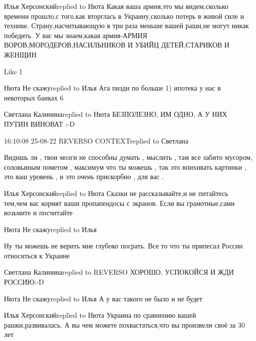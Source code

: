  
 
 
 
 

Илья Херсонскийreplied to Нюта
Какая ваша армия,это мы видем,сколько времени прошло,с того,как вторглась  в Украину,сколько потерь в живой силе и технике. Страну,насчитывающую в три раза меньше вашей раши,не могут никак победить. У вас мы знаем,какая армия-АРМИЯ ВОРОВ,МОРОДЕРОВ,НАСИЛЬНИКОВ И УБИЙЦ ДЕТЕЙ,СТАРИКОВ И ЖЕНЩИН

    Like 1

Нюта Не скажуreplied to Илья
Ага пизди по больше 1) ипотека у нас в некоторых банках 6%

Светлана Калининаreplied to Нюта
БЕЗПОЛЕЗНО, ИМ ОДНО, А У НИХ ПУТИН ВИНОВАТ :-D

16:10:08 25-08-22
REVERSO CONTEXTreplied to Светлана

Видишь ли , твои мозги не способны думать , мыслить , там все забито мусором,
соловьиным пометом , максимум что ты можешь , так это впихивать картинки , это
ваш уровень , и это очень прискорбно , для вас .

Илья Херсонскийreplied to Нюта
Сказки не рассказывайте,и не питайтесь тем,чем вас кормят ваши пропапендосы с экранов. Если вы грамотные,сами возьмите и посчитайте

Нюта Не скажуreplied to Илья

Ну ты можешь не верить мне глубоко посрать. Все то что ты припесал России
относиться к Украине

Светлана Калининаreplied to REVERSO
ХОРОШО, УСПОКОЙСЯ И ЖДИ РОССИЮ:-D

Нюта Не скажуreplied to Илья
А у вас такого не было и не будет

Илья Херсонскийreplied to Нюта
Украина по сравнению вашей рашки,развивалась. А вы чем можете похвастаться,что вы произвели своё за 30 лет
